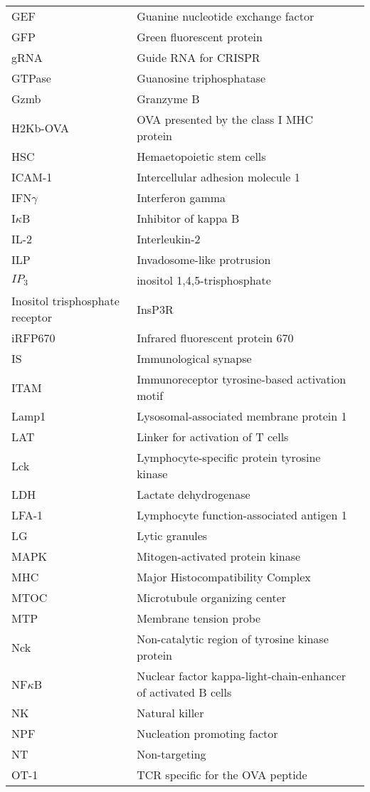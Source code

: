 \documentclass[phd,tocprelim]{cornell}
\begin{document}
\begin{table}
\begin{tabular}{l m{10cm} l}
	GEF & Guanine nucleotide exchange factor \\
	GFP & Green fluorescent protein \\
	gRNA & Guide RNA for CRISPR \\
	GTPase & Guanosine triphosphatase \\
	Gzmb & Granzyme B \\
	H2Kb-OVA & OVA presented by the class I MHC protein \\
	HSC & Hemaetopoietic stem cells \\
	ICAM-1 & Intercellular adhesion molecule 1 \\
	IFN$\gamma$ & Interferon gamma \\
	I$\kappa$B & Inhibitor of kappa B \\
	IL-2 & Interleukin-2 \\
	ILP & Invadosome-like protrusion\\
	$IP_3$ & inositol 1,4,5-trisphosphate \\
	Inositol trisphosphate receptor & InsP3R \\
	iRFP670 & Infrared fluorescent protein 670 \\
	IS & Immunological synapse \\
	ITAM & Immunoreceptor tyrosine-based activation motif \\
	Lamp1 & Lysosomal-associated membrane protein 1 \\
	LAT & Linker for activation of T cells \\
	Lck & Lymphocyte-specific protein tyrosine kinase \\
	LDH	& Lactate dehydrogenase \\
	LFA-1 & Lymphocyte function-associated antigen 1 \\
	LG & Lytic granules \\
	MAPK & Mitogen-activated protein kinase \\
	MHC & Major Histocompatibility Complex \\
	MTOC & Microtubule organizing center \\
	MTP & Membrane tension probe \\
	Nck & Non-catalytic region of tyrosine kinase protein \\
	NF$\kappa$B & Nuclear factor kappa-light-chain-enhancer of activated B cells \\
	NK & Natural killer \\
	NPF & Nucleation promoting factor \\
	NT & Non-targeting \\
	OT-1 & TCR specific for the OVA peptide \\

\end{tabular}
\end{table}
\end{document}
